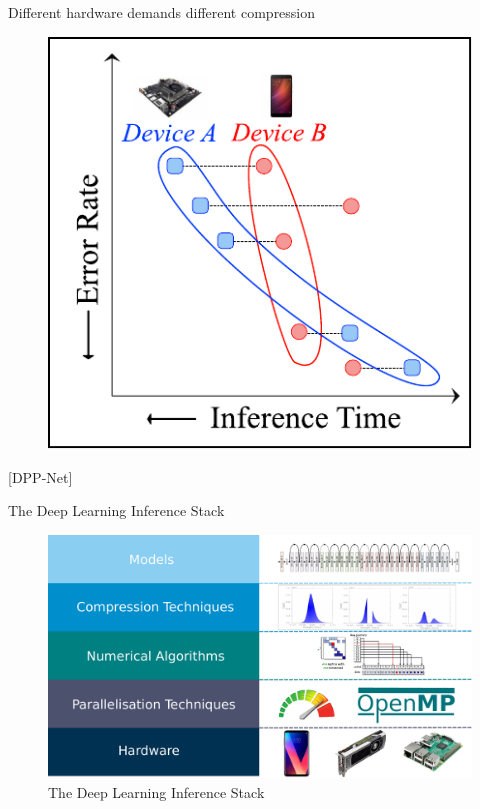 \documentclass[xcolor=dvipsnames]{beamer}
\begin{document}
\begin{frame}{Different hardware demands different compression}

\begin{figure}
    \centering
    \includegraphics{images/pareto_efficiency.pdf}
\end{figure}

[DPP-Net]
\end{frame}


\begin{frame}{The Deep Learning Inference Stack}
\begin{figure}
    \centering
    \includegraphics[width=\linewidth]{images/inference-stack.pdf}
    \caption{The Deep Learning Inference Stack}
\end{figure}
\end{frame}
\end{document}
